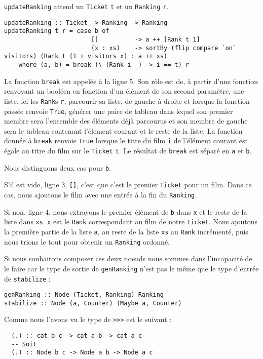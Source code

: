 \documentclass{llncs}
\begin{document}
\lstinline{updateRanking} attend un \lstinline{Ticket} \lstinline{t} et un
\lstinline{Ranking} \lstinline{r}.
\begin{lstlisting}
updateRanking :: Ticket -> Ranking -> Ranking
updateRanking t r = case b of
                        []          -> a ++ [Rank t 1]
                        (x : xs)    -> sortBy (flip compare `on` visitors) (Rank t (1 + visitors x) : a ++ xs)
    where (a, b) = break (\ (Rank i _) -> i == t) r
\end{lstlisting}
La fonction \lstinline{break} est appelée à la ligne 5.
Son rôle est de, à partir d'une fonction renvoyant un booléen en fonction d'un
élément de son second paramètre, une liste, ici les \lstinline{Rank}s \lstinline{r},
parcourir sa liste, de gauche à droite et lorsque la fonction passée renvoie
\lstinline{True}, générer une paire de tableau dans lequel son premier membre
sera l'ensemble des éléments déjà parcourus et son membre de gauche sera le
tableau contenant l'élement courant et le reste de la liste.
La fonction donnée à \lstinline{break} renvoie \lstinline{True} lorsque le titre
du film \lstinline{i} de l'élément courant est égale au titre du film sur le
\lstinline{Ticket} \lstinline{t}.
Le résultat de \lstinline{break} est séparé en \lstinline{a} et \lstinline{b}.

Nous distinguons deux cas pour \lstinline{b}.

S'il est vide, ligne 3, \lstinline{[]}, c'est que c'est le premier \lstinline{Ticket}
pour un film.
Dans ce cas, nous ajoutons le film avec une entrée à la fin du \lstinline{Ranking}.

Si non, ligne 4, nous extrayons le premier élément de \lstinline{b} dans \lstinline{x}
et le reste de la liste dans \lstinline{xs}.
\lstinline{x} est le \lstinline{Rank} correspondant au film de notre \lstinline{Ticket}.
Nous ajoutons la première partie de la liste \lstinline{a}, au reste de la liste
\lstinline{xs} au \lstinline{Rank} incrémenté, puis nous trions le tout pour obtenir
un \lstinline{Ranking} ordonné.

Si nous souhaitons composer ces deux noeuds nous sommes dans l'incapacité de le
faire car le type de sortie de \lstinline{genRanking} n'est pas le même que le
type d'entrée de \lstinline{stabilize} :
\begin{lstlisting}
genRanking :: Node (Ticket, Ranking) Ranking
stabilize :: Node (a, Counter) (Maybe a, Counter)
\end{lstlisting}

Comme nous l'avons vu le type de \lstinline{>>>} est le suivant :
\begin{lstlisting}
  (.) :: cat b c -> cat a b -> cat a c
  -- Soit
  (.) :: Node b c -> Node a b -> Node a c
\end{lstlisting}
\end{document}

